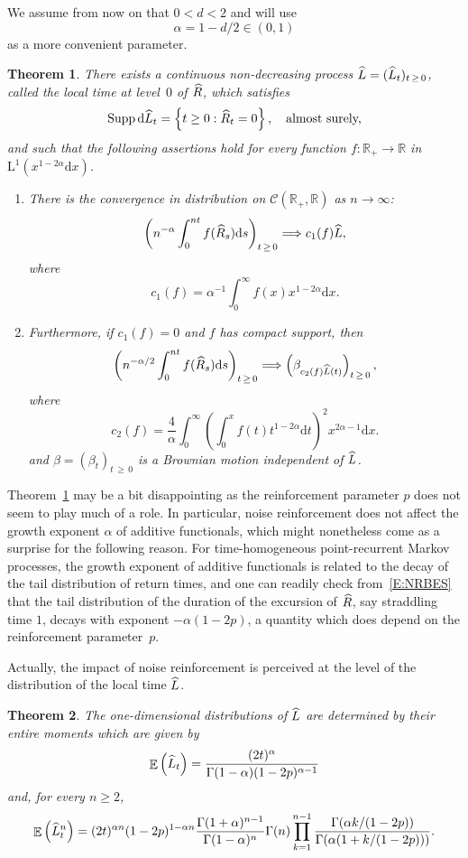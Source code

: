 \documentclass[10pt]{amsart}
\newtheorem{theo}{Theorem}[section]
\theoremstyle{definition}\newtheorem{defi}[theo]{Definition}\newtheorem{rema}[theo]{Remark}\newtheorem{exam}[theo]{Example}\newtheorem{exem}[theo]{Example}\newtheorem{nota}[theo]{Notation}
\renewcommand{\hat}[1]{\widehat{#1}}
\newcommand{\dd}{\mathrm{d}}
\newcommand{\rmL}{\mathrm{L}}
\newcommand{\Supp}{\mathrm{Supp}}
\DeclareMathOperator{\E}{\mathbb{E}}
\newcommand{\R}{\mathbb{R}}
\newcommand{\calC}{\mathcal{C}}
\newcommand*{\romanenumi}{\renewcommand*{\theenumi}{\roman{enumi}}}
\let\oldhat\hat
\renewcommand*{\hat}[1]{\mathchoice{\widehat{#1}}{\widehat{#1}}{\oldhat{#1}}{\oldhat{#1}}}
\begin{document}
We assume from now on that $0<d<2$ and will use
\[
\alpha= 1-d/2 \in(0,1)
\]
as a more convenient parameter.


\begin{theo}\label{T1}
There exists a continuous non-decreasing process $\hat{L} = (\hat{L}_t)_{t\,\geq\,0}$, called the local time at level~$0$ of $\hat R$, which satisfies
\[
\Supp\, \dd \hat{L}_t =\left\{t\geq0: \hat R_t=0\right\}, \quad \text{almost surely,}
\]
and such that the following assertions hold for every function $f: \R_+\to \R$ in $ \rmL^1(x^{1-2\alpha} \dd x)$.
\begin{enumerate}\romanenumi
\item \label{theo1.1.i}
There is the convergence in distribution on $\calC(\R_+,\R)$ as $n\to \infty$:
\[
\left(n^{-\alpha} \int_0^{nt} f(\hat R_s) \dd s\right)_{t\,\geq\,0} \Longrightarrow c_1(f)\hat{L},
\]
where
\[
c_1(f)= \alpha^{-1} \int_0^{\infty} f(x) x^{1-2\alpha} \dd x.
\]

\item\label{theo1.1.ii} Furthermore, if $c_1(f)=0$ and $f$ has compact support, then
\[
\left(n^{-\alpha/2} \int_0^{nt} f(\hat R_s) \dd s\right)_{t\,\geq\,0} \Longrightarrow \left(\beta_{c_2(f)\hat{L}(t)}\right)_{t\,\geq\,0},
\]
where
\[
c_2(f)= \frac{4}{\alpha} \int_0^{\infty} \left(\int_{0}^{x} f(t) t^{1-2\alpha} \dd t \right)^2 x^{2\alpha-1}\dd x.
\]
and $\beta = (\beta_t)_{t\,\geq\,0}$ is a Brownian motion independent of $\hat{L}$.
\end{enumerate}
\end{theo}


Theorem~\ref{T1} may be a bit disappointing as the reinforcement parameter $p$ does not seem to play much of a role. In particular, noise reinforcement does not affect the growth exponent $\alpha$ of additive functionals, which might nonetheless come as a surprise for the following reason. For time-homogeneous point-recurrent Markov processes, the growth exponent of additive functionals is related to the decay of the tail distribution of return times, and one can readily check from~\eqref{E:NRBES} that the tail distribution of the duration of the excursion of $\hat R$, say straddling time $1$, decays with exponent $-\alpha(1-2p)$, a quantity which does depend on the reinforcement parameter~$p$.


Actually, the impact of noise reinforcement is perceived at the level of the distribution of the local time $\hat{L}$.

\begin{theo}\label{T2}
The one-dimensional distributions of $\hat{L}$ are determined by their entire moments which are given by
\[
\E\left(\hat{L}_t\right)=\frac{(2t)^{\alpha }}{\Gamma(1-\alpha) (1-2p)^{\alpha -1}}
\]
and, for every $n\geq 2$,
\[
\E\left(\hat{L}_t^n\right)= (2t)^{\alpha n} (1-2p)^{1-\alpha n}
\frac{\Gamma(1+\alpha)^{n-1}}{ \Gamma(1-\alpha)^n} \Gamma(n)
\prod_{k=1}^{n-1} \frac{\Gamma(\alpha k/(1-2p))}{\Gamma(\alpha(1+k/(1-2p)))}.
\]
\end{theo}
\end{document}
